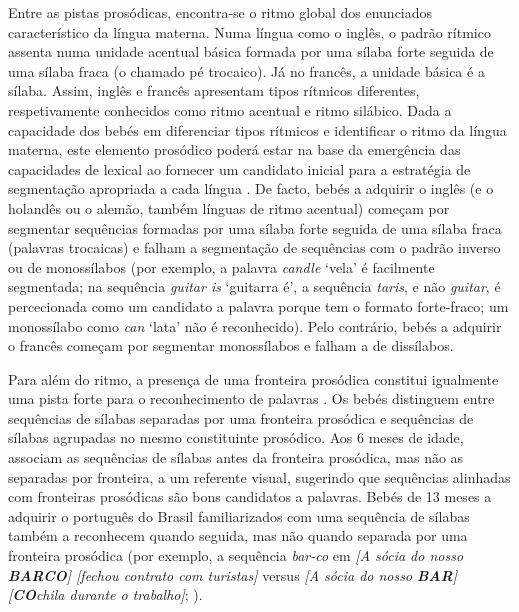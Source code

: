 \documentclass[output=paper]{LSP/langsci}
\begin{document}
Entre as pistas prosódicas, encontra-se o ritmo global dos enunciados característico da língua materna. Numa língua como o inglês, o padrão rítmico assenta numa unidade acentual básica formada por uma sílaba forte seguida de uma sílaba fraca (o chamado pé trocaico). Já no francês, a unidade básica é a sílaba. Assim, inglês e francês apresentam tipos rítmicos diferentes, respetivamente conhecidos como ritmo acentual e ritmo silábico. Dada a capacidade dos bebés em diferenciar tipos rítmicos e identificar o ritmo da língua materna, este elemento prosódico poderá estar na base da emergência das capacidades de  lexical ao fornecer um candidato inicial para a estratégia de segmentação apropriada a cada língua \citep{hohle2009,mersad_etal2010}. De facto, bebés a adquirir o inglês (e o holandês ou o alemão, também línguas de ritmo acentual) começam por segmentar sequências formadas por uma sílaba forte seguida de uma sílaba fraca (palavras trocaicas) e falham a segmentação de sequências com o padrão inverso ou de monossílabos (por exemplo, a palavra \textit{candle} `vela' é facilmente segmentada; na sequência \textit{guitar is} `guitarra é', a sequência \textit{taris}, e não \textit{guitar}, é percecionada como um candidato a palavra porque tem o formato forte-fraco; um monossílabo como \textit{can} `lata' não é reconhecido). Pelo contrário, bebés a adquirir o francês começam por segmentar monossílabos e falham a  de dissílabos.

Para além do ritmo, a presença de uma fronteira prosódica constitui igualmente uma pista forte para o reconhecimento de palavras \citep{shukla_etal2011}. Os bebés distinguem entre sequências de sílabas separadas por uma fronteira prosódica e sequências de sílabas agrupadas no mesmo constituinte prosódico. Aos 6 meses de idade, associam as sequências de sílabas antes da fronteira prosódica, mas não as separadas por fronteira, a um referente visual, sugerindo que sequências alinhadas com fronteiras prosódicas são bons candidatos a palavras. Bebés de 13 meses a adquirir o português do Brasil familiarizados com uma sequência de sílabas também a reconhecem quando seguida, mas não quando separada por uma fronteira prosódica (por exemplo, a sequência \textit{bar-co} em \textit{[A sócia do nosso \textbf{BARCO}] [fechou contrato com turistas]} versus \textit{[A sócia do nosso \textbf{BAR}]  [\textbf{CO}chila durante o trabalho]}; \citealt{silvaname2014}).
\end{document}
